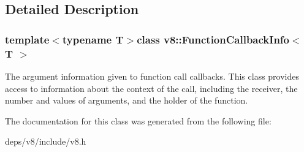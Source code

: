 \subsection{Detailed Description}
\subsubsection*{template$<$typename T$>$class v8\+::\+Function\+Callback\+Info$<$ T $>$}

The argument information given to function call callbacks. This class provides access to information about the context of the call, including the receiver, the number and values of arguments, and the holder of the function. 

The documentation for this class was generated from the following file\+:\begin{DoxyCompactItemize}
\item 
deps/v8/include/v8.\+h\end{DoxyCompactItemize}
